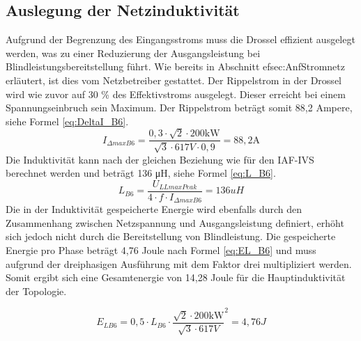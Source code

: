 		\subsection{Auslegung der Netzinduktivität}
			Aufgrund der Begrenzung des Eingangsstroms muss die Drossel effizient ausgelegt werden, was zu einer Reduzierung der Ausgangsleistung bei Blindleistungsbereitstellung führt. Wie bereits in Abschnitt ef{sec:AnfStromnetz} erläutert, ist dies vom Netzbetreiber gestattet. Der Rippelstrom in der Drossel wird wie zuvor auf 30 \% des Effektivstroms ausgelegt. Dieser erreicht bei einem Spannungseinbruch sein Maximum. Der Rippelstrom beträgt somit 88,2 Ampere, siehe Formel \ref{eq:DeltaI_B6}.\\
			
			\begin{equation}
				\label{eq:DeltaI_B6}
				I_{\Delta max B6}= \dfrac{0,3\cdot \sqrt{2} \cdot 200 \si{\kilo \watt}}{\sqrt{3} \cdot 617 \si{V} \cdot 0,9} = 88,2 \si{\A}
			\end{equation}
			Die Induktivität kann nach der gleichen Beziehung wie für den \gls{IAF}-\gls{IVS} berechnet werden und beträgt 136 \si{\micro \henry}, siehe Formel \ref{eq:L_B6}.
			\begin{equation}
				\label{eq:L_B6}
				L_{B6}= \dfrac{U_{LLmaxPeak}}{4\cdot f \cdot I_{\Delta max B6}} = 136 uH
			\end{equation}
			Die in der Induktivität gespeicherte Energie wird ebenfalls durch den Zusammenhang zwischen Netzspannung und Ausgangsleistung definiert, erhöht sich jedoch nicht durch die Bereitstellung von Blindleistung. Die gespeicherte Energie pro Phase beträgt 4,76 Joule nach Formel \ref{eq:EL_B6} und muss aufgrund der dreiphasigen Ausführung mit dem Faktor drei multipliziert werden. Somit ergibt sich eine Gesamtenergie von 14,28 Joule für die Hauptinduktivität der Topologie.
			
			\begin{equation}
			\label{eq:EL_B6}
			E_{LB6}=0,5 \cdot L_{B6} \cdot {\dfrac{\sqrt{2} \cdot 200 \si{\kilo \watt} }{\sqrt{3} \cdot 617 V}}^{2} = 4,76 J
			\end{equation}
			
			

		
